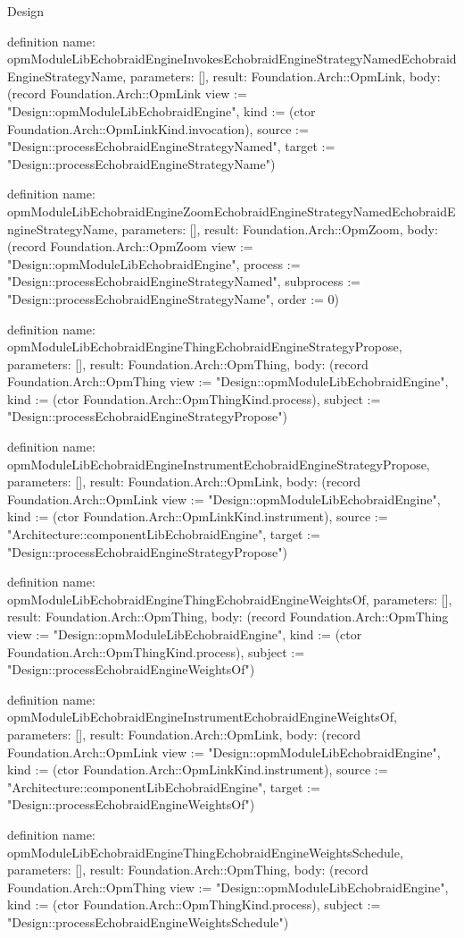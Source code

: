 \begin{lexlean}{Design}
\begin{semanticmodule}
definition{
  name: opmModuleLibEchobraidEngineInvokesEchobraidEngineStrategyNamedEchobraidEngineStrategyName,
  parameters: [],
  result: Foundation.Arch::OpmLink,
  body: (record Foundation.Arch::OpmLink {view := "Design::opmModuleLibEchobraidEngine", kind := (ctor Foundation.Arch::OpmLinkKind.invocation), source := "Design::processEchobraidEngineStrategyNamed", target := "Design::processEchobraidEngineStrategyName"})
}

definition{
  name: opmModuleLibEchobraidEngineZoomEchobraidEngineStrategyNamedEchobraidEngineStrategyName,
  parameters: [],
  result: Foundation.Arch::OpmZoom,
  body: (record Foundation.Arch::OpmZoom {view := "Design::opmModuleLibEchobraidEngine", process := "Design::processEchobraidEngineStrategyNamed", subprocess := "Design::processEchobraidEngineStrategyName", order := 0})
}

definition{
  name: opmModuleLibEchobraidEngineThingEchobraidEngineStrategyPropose,
  parameters: [],
  result: Foundation.Arch::OpmThing,
  body: (record Foundation.Arch::OpmThing {view := "Design::opmModuleLibEchobraidEngine", kind := (ctor Foundation.Arch::OpmThingKind.process), subject := "Design::processEchobraidEngineStrategyPropose"})
}

definition{
  name: opmModuleLibEchobraidEngineInstrumentEchobraidEngineStrategyPropose,
  parameters: [],
  result: Foundation.Arch::OpmLink,
  body: (record Foundation.Arch::OpmLink {view := "Design::opmModuleLibEchobraidEngine", kind := (ctor Foundation.Arch::OpmLinkKind.instrument), source := "Architecture::componentLibEchobraidEngine", target := "Design::processEchobraidEngineStrategyPropose"})
}

definition{
  name: opmModuleLibEchobraidEngineThingEchobraidEngineWeightsOf,
  parameters: [],
  result: Foundation.Arch::OpmThing,
  body: (record Foundation.Arch::OpmThing {view := "Design::opmModuleLibEchobraidEngine", kind := (ctor Foundation.Arch::OpmThingKind.process), subject := "Design::processEchobraidEngineWeightsOf"})
}

definition{
  name: opmModuleLibEchobraidEngineInstrumentEchobraidEngineWeightsOf,
  parameters: [],
  result: Foundation.Arch::OpmLink,
  body: (record Foundation.Arch::OpmLink {view := "Design::opmModuleLibEchobraidEngine", kind := (ctor Foundation.Arch::OpmLinkKind.instrument), source := "Architecture::componentLibEchobraidEngine", target := "Design::processEchobraidEngineWeightsOf"})
}

definition{
  name: opmModuleLibEchobraidEngineThingEchobraidEngineWeightsSchedule,
  parameters: [],
  result: Foundation.Arch::OpmThing,
  body: (record Foundation.Arch::OpmThing {view := "Design::opmModuleLibEchobraidEngine", kind := (ctor Foundation.Arch::OpmThingKind.process), subject := "Design::processEchobraidEngineWeightsSchedule"})
}


\end{semanticmodule}
\end{lexlean}
